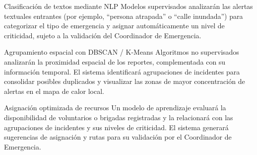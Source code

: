 \documentclass[10pt,letterpaper]{article}
\newcommand{\sectionicon}[1]{\textcolor{cyan}{#1}\enspace}
\begin{document}
\begin{techbox}{\sectionicon{\faComments}Clasificación de textos mediante NLP}
\small\justifying
Modelos supervisados analizarán las alertas textuales entrantes (por ejemplo, ``persona atrapada'' o ``calle inundada'') para categorizar el tipo de emergencia y asignar automáticamente un nivel de criticidad, sujeto a la validación del Coordinador de Emergencia.
\end{techbox}
\begin{techbox}{\sectionicon{\faProjectDiagram}Agrupamiento espacial con DBSCAN / K-Means}
\small\justifying
Algoritmos no supervisados analizarán la proximidad espacial de los reportes, complementada con su información temporal. El sistema identificará agrupaciones de incidentes para consolidar posibles duplicados y visualizar las zonas de mayor concentración de alertas en el mapa de calor local.
\end{techbox}
\begin{techbox}{\sectionicon{\faRoute}Asignación optimizada de recursos}
\small\justifying
Un modelo de aprendizaje evaluará la disponibilidad de voluntarios o brigadas registradas y la relacionará con las agrupaciones de incidentes y sus niveles de criticidad. El sistema generará sugerencias de asignación y rutas para su validación por el Coordinador de Emergencia.
\end{techbox}
\end{document}
